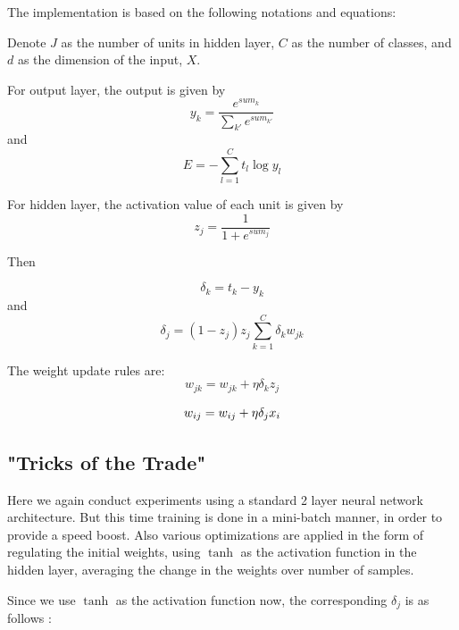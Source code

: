 \documentclass[11pt,twoside]{article}
\begin{document}
The implementation is based on the following notations and equations:

Denote $J$ as the number of units in hidden layer, $C$ as the number of classes, and $d$ as the dimension of the input, $X$.
      
For output layer, the output is given by 
\begin{equation}
y_{k} = \frac{e^{sum_{k}}}{\sum_{k'}e^{sum_{k'}}}
\end{equation}
and
\begin{equation}
E = -\sum_{l = 1}^{C}t_{l}\log y_{l}
\end{equation}

For hidden layer, the activation value of each unit is  given by 
\begin{equation}
z_{j} = \frac{1}{1 + e^{sum_{j}}}
\end{equation}

Then 

\begin{equation}
\delta_{k} = t_{k} - y_{k}
\end{equation}
and
\begin{equation}
\delta_{j} = (1 - z_{j})z_{j} \sum_{k = 1}^{C} \delta_{k} w_{jk}
\end{equation}

The weight update rules are:\\
\begin{equation}
w_{jk} = w_{jk} + \eta\delta_{k}z_{j}
\end{equation}

\begin{equation}
w_{ij} = w_{ij} + \eta\delta_{j}x_{i}\\
\end{equation}

\subsection{"Tricks of the Trade"}

Here we again conduct experiments using a standard 2 layer neural network architecture. But this time training is done in a mini-batch manner, in order to provide a speed boost. Also various optimizations are applied in the form of regulating the initial weights, using $\tanh$ as the activation function in the hidden layer, averaging the change in the weights over number of samples.

Since we use $\tanh$ as the activation function now, the corresponding $\delta_{j}$ is as follows :
\end{document}
